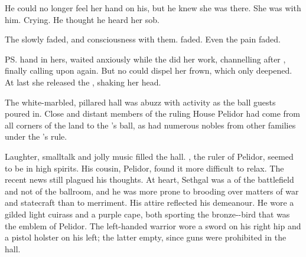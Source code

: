 \begin{garbage}
He could no longer feel her hand on his, but he knew she was there. 
She was with him. 
Crying. 
He thought he heard her sob. 


The \Sephiroth{} slowly faded, and consciousness with them. 
\Tiroco{} faded. 
Even the pain faded. 




\begin{comment}
\subsection{Into the Light}
\end{comment}

\new
\ps{\Icor}{} hand in hers, \Tiroco{} waited anxiously while the \soror{} did her work, channelling \Sephirah{} after \Sephirah{}, finally calling upon \Ishiel{} again. But no \Archon{} could dispel her frown, which only deepened. At last she released the \rayuth, shaking her head. 
\end{garbage}








\begin{comment}
\subsection{Icor dies}
\end{comment}
\new
The white-marbled, pillared hall was abuzz with activity as the ball guests poured in. 
Close and distant members of the ruling House Pelidor had come from all corners of the land to the \rayuth's ball, as had numerous nobles from other families under the \rayuth's rule. 

Laughter, smalltalk and jolly music filled the hall. 
\Rayuth[\Icor], the ruler of Pelidor, seemed to be in high spirits. 
His cousin, \rah[Sethgal] Pelidor, found it more difficult to relax. 
The recent news still plagued his thoughts. 
At heart, Sethgal was a \scatha of the battlefield and not of the ballroom, and he was more prone to brooding over matters of war and statecraft than to merriment. 
His attire reflected his demeanour. 
He wore a gilded light cuirass and a purple cape, both sporting the bronze-\coloured \grulcan-bird that was the emblem of Pelidor. 
The left-handed warrior wore a sword on his right hip and a pistol holster on his left; the latter empty, since guns were prohibited in the hall. 

